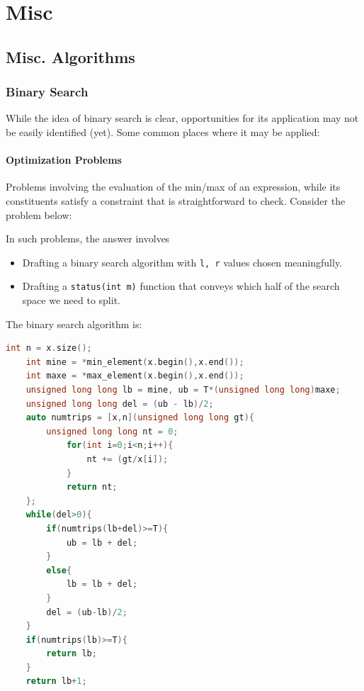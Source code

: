 \documentclass{report}
\begin{document}
\chapter{Misc}
\section{Misc. Algorithms}
\subsection{Binary Search}
While the idea of binary search is clear, opportunities
for its application may not be easily identified (yet). Some
common places where it may be applied:
\subsubsection*{Optimization Problems}
Problems involving the evaluation of the min/max of an expression,
while its constituents satisfy a constraint that is straightforward to
check. Consider the problem below:\\
\begin{center}
\end{center}
In such problems, the answer involves
\begin{itemize}
    \item Drafting a binary search algorithm with \texttt{l, r} values chosen meaningfully.
    \item Drafting a \texttt{status(int m)} function that
    conveys which half of the search space we need to split.
\end{itemize}
The binary search algorithm is:
\begin{lstlisting}[language=C++,caption=BinSearch]
    int n = x.size();
    int mine = *min_element(x.begin(),x.end());
    int maxe = *max_element(x.begin(),x.end());
    unsigned long long lb = mine, ub = T*(unsigned long long)maxe;
    unsigned long long del = (ub - lb)/2;
    auto numtrips = [x,n](unsigned long long gt){
        unsigned long long nt = 0;
            for(int i=0;i<n;i++){
                nt += (gt/x[i]);
            }
            return nt;
    };
    while(del>0){
        if(numtrips(lb+del)>=T){
            ub = lb + del;
        }
        else{
            lb = lb + del;
        }
        del = (ub-lb)/2;
    }
    if(numtrips(lb)>=T){
        return lb;
    }
    return lb+1;
\end{lstlisting}
\end{document}
